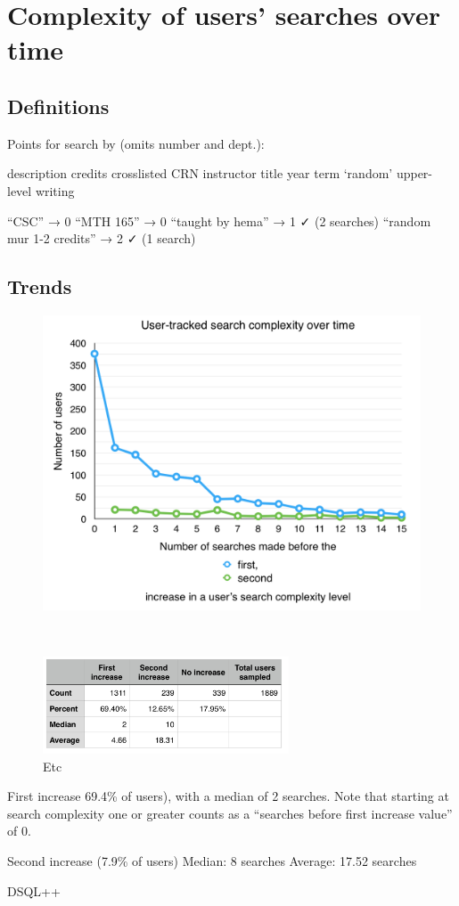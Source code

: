 
\section{Complexity of users' searches over time}

\subsection{Definitions}

Points for search by (omits number and dept.):

description
credits
crosslisted
CRN
instructor
title
year
term
‘random’
upper-level writing

“CSC” → 0
“MTH 165” → 0
“taught by hema” → 1   ✓    (2 searches) 
“random mur 1-2 credits” → 2   ✓    (1 search) 


\subsection{Trends}

\begin{figure}
  \centering

  \includegraphics[width=1.00\textwidth]{images/graph/search_dt}

  \\
  \vspace{30pt}

  \includegraphics[width=0.65\textwidth]{images/table/search_dt}

  \caption{Etc}
  \label{fig:searchtypes}
\end{figure}

First increase 69.4\% of users), with a median of 2 searches.
Note that starting at search complexity one or greater counts as a ``searches before first increase value'' of 0.

Second increase (7.9\% of users)
Median: 8 searches
Average: 17.52 searches

DSQL++